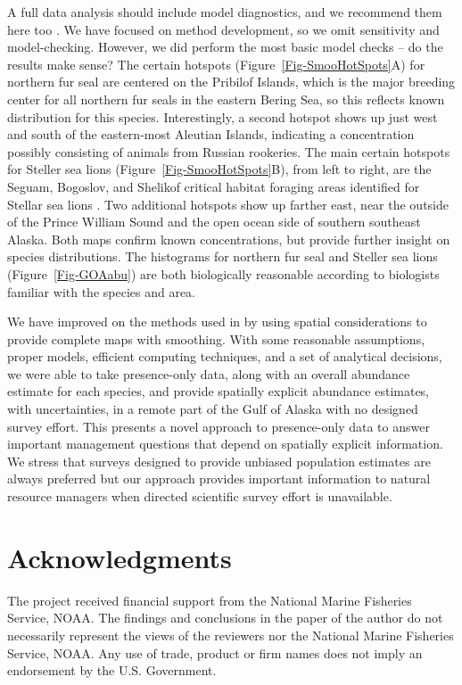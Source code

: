 \documentclass[11pt, titlepage]{article}
\begin{document}
\begin{spacing}{1.9}
\begin{flushleft}
A full data analysis should include model diagnostics, and we recommend them here too \citep{conn_guide_2018}.  We have focused on method development, so we omit sensitivity and model-checking.  However, we did perform the most basic model checks -- do the results make sense?  The certain hotspots (Figure~\ref{Fig-SmooHotSpots}A) for northern fur seal are centered on the Pribilof Islands, which is the major breeding center for all northern fur seals in the eastern Bering Sea, so this reflects known distribution for this species.  Interestingly, a second hotspot shows up just west and south of the eastern-most Aleutian Islands, indicating a concentration possibly consisting of animals from Russian rookeries. The main certain hotspots for Steller sea lions (Figure~\ref{Fig-SmooHotSpots}B), from left to right, are the Seguam, Bogoslov, and Shelikof critical habitat foraging areas identified for Stellar sea lions \citep{HimesBoorEtAl2012Stellersealion}.  Two additional hotspots show up farther east, near the outside of the Prince William Sound and the open ocean side of southern southeast Alaska.  Both maps confirm known concentrations, but provide further insight on species distributions.  The histograms for northern fur seal and Steller sea lions (Figure~\ref{Fig-GOAabu}) are both biologically reasonable according to biologists familiar with the species and area.

We have improved on the methods used in \citet{HimesBoorEtAl2012Stellersealion} by using spatial considerations to provide complete maps with smoothing. With some reasonable assumptions, proper models, efficient computing techniques, and a set of analytical decisions, we were able to take presence-only data, along with an overall abundance estimate for each species, and provide spatially explicit abundance estimates, with uncertainties, in a remote part of the Gulf of Alaska with no designed survey effort.  This presents a novel approach to presence-only data to answer important management questions that depend on spatially explicit information.  We stress that surveys designed to provide unbiased population estimates are always preferred but our approach provides important information to natural resource managers when directed scientific survey effort is unavailable.  
 
\section*{Acknowledgments}

The project received financial support from the National Marine Fisheries Service, NOAA. The findings and conclusions in the paper of the author do not necessarily represent the views of the reviewers nor the National Marine Fisheries Service, NOAA. Any use of trade, product or firm names does not imply an endorsement by the U.S. Government.


\end{flushleft}
\end{spacing}
\end{document}
